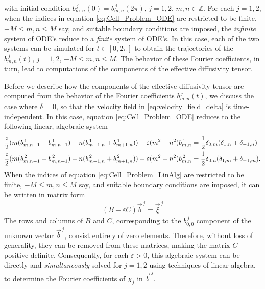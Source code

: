 \documentclass{article}
\newcommand{\0}{\mathbf{0}}
\newcommand{\1}{\mathbf{1}}
\newcommand{\2}{\mathbf{2}}
\newcommand{\3}{\mathbf{3}}
\newcommand{\4}{\mathbf{4}}
\newcommand{\5}{\mathbf{5}}
\newcommand{\6}{\mathbf{6}}
\newcommand{\7}{\mathbf{7}}
\newcommand{\8}{\mathbf{8}}
\begin{document}
%
with  initial condition $b^{\,j}_{m,n}(0)=b^{\,j}_{m,n}(2\pi)$, $j=1,2$,
$m,n\in\mathbb{Z}$. For each $j=1,2$, when the indices in equation
\eqref{eq:Cell_Problem_ODE} are restricted to be finite, $-M\leq m,n\leq M$
say, and suitable boundary conditions are imposed, the \emph{infinite}
system of ODE's reduce to a \emph{finite} system of ODE's. In this
case, each of the two systems can be simulated for $t\in[0,2\pi]$ to obtain
the trajectories of the $b^{\,j}_{m,n}(t)$, $j=1,2$, $-M\leq m,n\leq M$. The
behavior of these Fourier coefficients, in turn, lead to computations
of the components of the effective diffusivity tensor.    






Before we describe how the components of the effective diffusivity
tensor are computed from the behavior of the Fourier coefficients
$b^{\,j}_{m,n}(t)$, we discuss the case where $\delta=0$, so that the
velocity field in \eqref{eq:velocity_field_delta} is
time-independent. In this case, equation  \eqref{eq:Cell_Problem_ODE}
reduces to the following linear, algebraic system 
%
\begin{align}\label{eq:Cell_Problem_LinAlg}
    \frac{\imath}{2}(m(b^{\,1}_{m,n-1}+b^{\,1}_{m,n+1})+n(b^{\,1}_{m-1,n}+b^{\,1}_{m+1,n}))      
    +\varepsilon(m^2+n^2)b^{\,1}_{m,n}
    &=\frac{1}{2}\delta_{0,m}(\delta_{1,n}+\delta_{-1,n})          
    \\
    \frac{\imath}{2}(m(b^{\,2}_{m,n-1}+b^{\,2}_{m,n+1})+n(b^{\,2}_{m-1,n}+b^{\,2}_{m+1,n}))    
    +\varepsilon(m^2+n^2)b^{\,2}_{m,n}    
    &=\frac{1}{2}\delta_{0,n}(\delta_{1,m}+\delta_{-1,m}).       
    \notag          
\end{align}
%
When the indices of equation \eqref{eq:Cell_Problem_LinAlg} are
restricted to be finite, $-M\leq m,n\leq M$ say, and suitable boundary
conditions are imposed, it can be written in matrix form  
%
\begin{align}
  (B+\varepsilon C)\vec{b}^{\,j}=\vec{\xi}^{\,j}
\end{align}
%
The rows and columns of $B$ and $C$, corresponding to the $b^{\,j}_{0,0}$
component of the unknown vector $\vec{b}^{\,j}$, consist entirely of zero
elements. Therefore, without loss of generality, they can be removed
from these matrices, making the matrix $C$
positive-definite. Consequently, for each $\varepsilon>0$, this algebraic system
can be directly and \emph{simultaneously} solved for $j=1,2$ using
techniques of linear algebra, to determine the Fourier coefficients of
$\chi_j$ in $\vec{b}^{\,j}$.    
\end{document}
